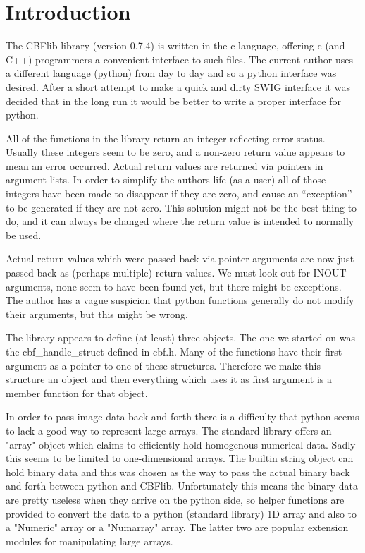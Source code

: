 \documentclass[10pt,a4paper,twoside,notitlepage]{article}
\begin{document}
\section{Introduction}

The CBFlib library (version 0.7.4) is written in the c language, offering c
 (and C++)
programmers a convenient interface to such files.
The current author uses a different language (python) from day to day and 
so a python interface was desired. 
After a short attempt to make a quick and dirty SWIG interface it was decided
that in the long run it would be better to write a proper interface for python.

All of the functions in the library return an integer reflecting error status.
Usually these integers seem to be zero, and a non-zero return value appears
to mean an error occurred.
Actual return values are returned via pointers in argument lists.
In order to simplify the authors life (as a user) all of those integers have
been made to disappear if they are zero, and cause an ``exception'' to 
be generated if they are not zero. 
This solution might not be the best thing to do, and it can always be changed 
where the return value is intended to normally be used.

Actual return values which were passed back via pointer arguments are now
just passed back as (perhaps multiple) return values.
We must look out for INOUT arguments, none seem to have been found yet, but there 
might be exceptions.
The author has a vague suspicion that python functions generally do not modify their
arguments, but this might be wrong.

The library appears to define (at least) three objects. The one we started on
was the cbf\_handle\_struct defined in cbf.h. 
Many of the functions have their first argument as a pointer to one
of these structures. Therefore we make this structure an object and then 
everything which uses it as first argument is a member function for that
object.

In order to pass image data back and forth there is a difficulty that python
seems to lack a good way to represent large arrays.
The standard library offers an "array" object which claims to efficiently
hold homogenous numerical data. 
Sadly this seems to be limited to one-dimensional arrays.
The builtin string object can hold binary data and this was chosen as 
the way to pass the actual binary back and forth between python and CBFlib.
Unfortunately this means the binary data are pretty useless when they arrive
on the python side, so helper functions are provided to convert the data
to a python (standard library) 1D array and also to a "Numeric" array or a
"Numarray" array. 
The latter two are popular extension modules for manipulating large arrays.
\end{document}
